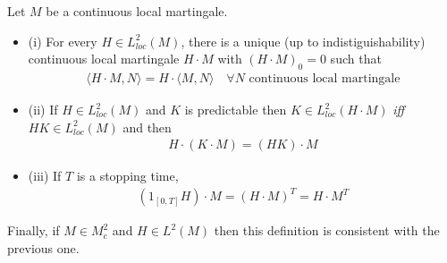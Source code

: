 \documentclass[12pt,a4paper]{article}
\renewenvironment{i}
{\begin{itemize} 
	}%
	{\end{itemize}
}
\begin{document}
\thm Let $M$ be a continuous local martingale.
\begin{i}
\item[(i)] For every $H \in L^2_{loc}(M)$, there is a unique (up to indistiguishability) continuous local martingale $H\cdot M$ with $(H\cdot M)_0 =0$ such that
\begin{align*}
\langle H \cdot M, N \rangle = H \cdot \langle M, N\rangle \quad \forall N \text{ continuous local martingale}
\end{align*}
\item[(ii)] If $H\in L_{loc}^2(M)$ and $K$ is predictable then $K\in L^2_{loc}(H \cdot M)$ \emph{iff} $HK\in L^2_{loc}(M)$ and then
\begin{align*}
H \cdot (K \cdot M) = (HK) \cdot M
\end{align*}
\item[(iii)] If $T$ is a stopping time,
\begin{align*}
(1_{[0, T]} H)\cdot M = (H \cdot M)^T = H\cdot M^T
\end{align*}
\end{i}
Finally, if $M\in M^2_c$ and $H\in L^2(M)$ then this definition is consistent with the previous one. 
\end{document}
